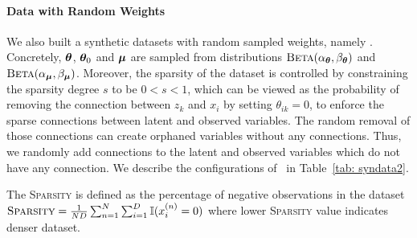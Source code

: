 \paragraph{Data with Random Weights}
We also built a synthetic datasets with random sampled weights, namely \sparse. 
Concretely, $\bm{\theta}$, $\bm{\theta}_0$ and $\bm{\mu}$ are sampled from distributions $\textsc{Beta}(\alpha_{\bm{\theta}}, \beta_{\bm{\theta}})$ and $\textsc{Beta}(\alpha_{\bm{\mu}}, \beta_{\bm{\mu}})$. Moreover, the sparsity of the dataset is controlled by constraining the sparsity degree $s$ to be $0<s<1$, which can be viewed as the probability of removing the connection between $z_k$ and $x_i$ by setting $\theta_{ik}=0$, to enforce the sparse connections between latent and observed variables. The random removal of those connections can create orphaned variables without any connections. Thus, we randomly add connections to the latent and observed variables which do not have any connection. We describe the configurations of \sparse\  in Table~\ref{tab: syndata2}. 

The \textsc{Sparsity} is defined as the percentage of negative observations in the dataset $\textsc{Sparsity} = \frac{1}{ND}\sum_{n=1}^N \sum_{i=1}^D \mathbb{I}(x^{(n)}_i=0)$
where lower \textsc{Sparsity} value indicates denser dataset. %


 

